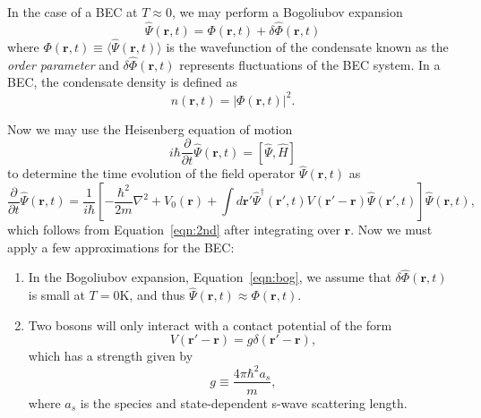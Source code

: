 In the case of a BEC at $T\approx0$, we may perform a Bogoliubov expansion~\cite{Bogoliubov1947, Dalfovo1999}
\begin{equation}
    \hat \Psi (\mathbf{r}, t) = \Phi(\mathbf{r},t) + \delta \hat \Phi(\mathbf{r},t)
\label{eqn:bog}
\end{equation}
where $\Phi(\mathbf{r},t) \equiv \langle \hat \Psi(\mathbf{r},t) \rangle$ is the wavefunction of the condensate known as the \textit{order parameter} and $\delta \hat \Phi(\mathbf{r},t)$ represents fluctuations of the BEC system.
In a BEC, the condensate density is defined as
\begin{equation}
    n(\mathbf{r},t) = |\Phi(\mathbf{r},t)|^2.
\end{equation}

Now we may use the Heisenberg equation of motion
\begin{equation}
    i\hbar \frac{\partial}{\partial t}\hat \Psi(\mathbf{r},t) = [\hat \Psi, \hat H]
\end{equation}
    to determine the time evolution of the field operator $\hat \Psi(\mathbf{r},t)$ as
\begin{equation}
    \frac{\partial}{\partial t}\hat \Psi(\mathbf{r},t) = \frac{1}{i\hbar}\left[-\frac{\hbar^2}{2m}\nabla^2 + V_0(\mathbf{r}) + \int d\mathbf{r'} \hat \Psi^\dagger(\mathbf{r'}, t)V(\mathbf{r'} -\mathbf{r})\hat \Psi(\mathbf{r'},t)\right]\hat \Psi(\mathbf{r},t),
\end{equation}
which follows from Equation~\eqref{eqn:2nd} after integrating over $\mathbf{r}$. 
Now we must apply a few approximations for the BEC:
\begin{enumerate}
    \item In the Bogoliubov expansion, Equation~\eqref{eqn:bog}, we assume that $\delta \hat \Phi(\mathbf{r},t)$ is small at $T = 0\text{K}$, and thus $\hat \Psi(\mathbf{r},t) \approx \Phi(\mathbf{r},t)$. 
    \item Two bosons will only interact with a contact potential of the form
    \begin{equation}
        V(\mathbf{r'}-\mathbf{r}) = g\delta(\mathbf{r'} - \mathbf{r}),
    \end{equation}
    which has a strength given by
    \begin{equation}
        g \equiv \frac{4 \pi \hbar^2 a_s}{m},
    \end{equation}
    where $a_s$ is the species and state-dependent s-wave scattering length.
\end{enumerate}

